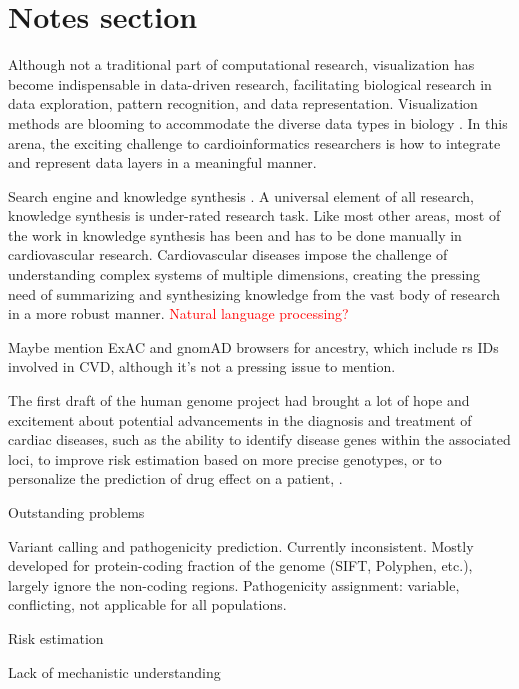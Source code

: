 \documentclass[letter]{bioinfo}
\newcommand{\comment}[1]{\textcolor{red}{#1}}
\begin{document}
	
	
	\section*{Notes section}
	
	Although not a traditional part of computational research, visualization has become indispensable in data-driven research, facilitating biological research in data exploration, pattern recognition, and data representation. Visualization methods are blooming to accommodate the diverse data types in biology \citep{Pavlopoulos:2015:Visualizing}. In this arena, the exciting challenge to cardioinformatics researchers is how to integrate and represent data layers in a meaningful manner.
		
		
	Search engine and knowledge synthesis \citep{Lutjohann:2011:Sciencenet}. A universal element of all research, knowledge synthesis is under-rated research task. Like most other areas, most of the work in knowledge synthesis has been and has to be done manually in cardiovascular research. Cardiovascular diseases impose the challenge of understanding complex systems of multiple dimensions, creating the pressing need of summarizing and synthesizing knowledge from the vast body of research in a more robust manner. \comment{Natural language processing?}
		
		
	
	Maybe mention ExAC and gnomAD browsers for ancestry, which include rs IDs involved in CVD, although it's not a pressing issue to mention.
	
	The first draft of the human genome project had brought a lot of hope and excitement about potential advancements in the diagnosis and treatment of cardiac diseases, such as the ability to identify disease genes within the associated loci, to improve risk estimation based on more precise genotypes, or to personalize the prediction of drug effect on a patient, \citep{Komajda:2001:heart}.
	
	
	Outstanding problems
	
	Variant calling and pathogenicity prediction. Currently inconsistent. Mostly developed for protein-coding fraction of the genome (SIFT, Polyphen, etc.), largely ignore the non-coding regions.
	Pathogenicity assignment: variable, conflicting, not applicable for all populations.
	
	Risk estimation
	
	Lack of mechanistic understanding
	
\end{document}
